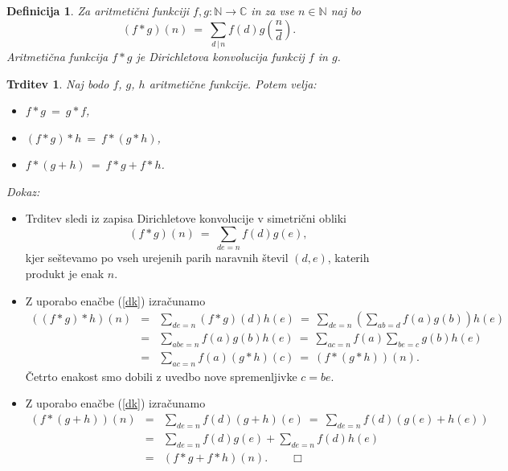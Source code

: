 \documentclass[a4paper,12pt]{article}
\def\N{\mathbb{N}} %
\def\C{\mathbb{C}} %
\def\qedm{\qquad\Box}   %
\newtheorem{trditev}{Trditev}
\newtheorem{definicija}{Definicija}
\begin{document}
\begin{definicija}
Za aritmetični funkciji $f, g: \N \to \C$ in za vse $n \in \N$ naj bo 
\[
(f * g)(n) \ =\ \sum_{d\,|\,n} f(d)g\left(\frac{n}{d}\right).
\]
Aritmetična funkcija $f * g$ je {\em Dirichletova konvolucija\/} funkcij $f$ in $g$.
\end{definicija}

\begin{trditev}
\label{kolo}
Naj bodo $f$, $g$, $h$ aritmetične funkcije. Potem velja:
\begin{itemize}
\item[\rm (i)] $f * g \ =\ g * f$,
\item[\rm (ii)] $(f * g) * h \ =\ f * (g * h)$,
\item[\rm (iii)] $f * (g + h) \ =\ f * g + f * h$.
\end{itemize}
\end{trditev}

\noindent
{\em Dokaz:\/} 
\begin{itemize}
\item[\rm (i)] 
Trditev sledi iz zapisa Dirichletove konvolucije v simetrični obliki
\begin{equation}
\label{dk}
(f * g)(n) \ =\ \sum_{d e = n} f(d)g(e),
\end{equation}
kjer seštevamo po vseh urejenih parih naravnih števil $(d,e)$, katerih produkt je enak $n$.

\item[\rm (ii)] 
Z uporabo enačbe (\ref{dk}) izračunamo
\begin{eqnarray*}
((f * g) * h)(n) &=& \sum_{d e = n} (f * g)(d)h(e)
\ =\ \sum_{d e = n} \left(\sum_{a b = d} f(a)g(b)\right)h(e) \\
 &=& \sum_{a b e = n} f(a)g(b)h(e)
 \ =\ \sum_{a c = n} f(a) \sum_{b e = c} g(b)h(e) \\
 &=& \sum_{a c = n} f(a) (g * h)(c)
 \ =\ (f * (g * h))(n).
\end{eqnarray*}
Četrto enakost smo dobili z uvedbo nove spremenljivke $c = b e$.


\item[\rm (iii)]
Z uporabo enačbe (\ref{dk}) izračunamo
\begin{eqnarray*}
(f * (g + h))(n) &=& \sum_{d e = n} f(d)(g+h)(e)
\ =\ \sum_{d e = n} f(d)(g(e)+h(e)) \\
 &=& \sum_{d e = n} f(d)g(e) + \sum_{d e = n} f(d)h(e) \\
 &=& (f * g + f * h)(n). \qedm
\end{eqnarray*}

\end{itemize}
\end{document}
